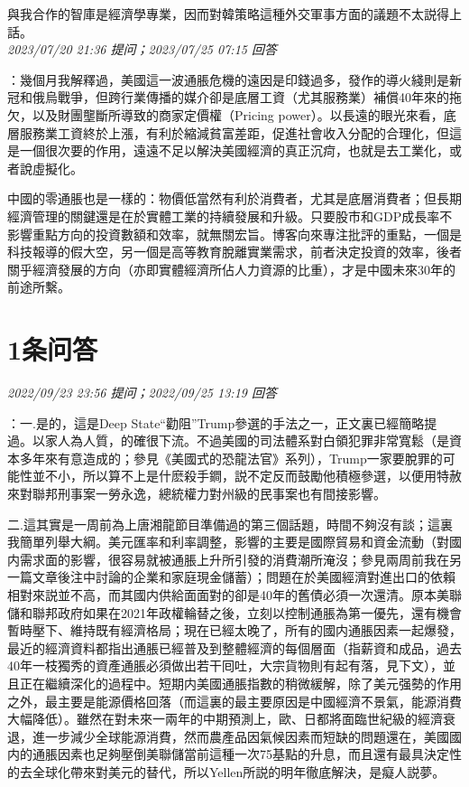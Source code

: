 \documentclass[twocolumn]{ctexart}
\begin{document}
與我合作的智庫是經濟學專業，因而對韓策略這種外交軍事方面的議題不太説得上話。
\\

\textit{\hfill\noindent\small 2023/07/20 21:36 提问；2023/07/25 07:15 回答}

：幾個月我解釋過，美國這一波通脹危機的遠因是印錢過多，發作的導火綫則是新冠和俄烏戰爭，但跨行業傳播的媒介卻是底層工資（尤其服務業）補償40年來的拖欠，以及財團壟斷所導致的商家定價權（Pricing power）。以長遠的眼光來看，底層服務業工資終於上漲，有利於縮減貧富差距，促進社會收入分配的合理化，但這是一個很次要的作用，遠遠不足以解決美國經濟的真正沉疴，也就是去工業化，或者說虛擬化。

中國的零通脹也是一樣的：物價低當然有利於消費者，尤其是底層消費者；但長期經濟管理的關鍵還是在於實體工業的持續發展和升級。只要股市和GDP成長率不影響重點方向的投資數額和效率，就無關宏旨。博客向來專注批評的重點，一個是科技報導的假大空，另一個是高等教育脫離實業需求，前者決定投資的效率，後者關乎經濟發展的方向（亦即實體經濟所佔人力資源的比重），才是中國未來30年的前途所繫。
\\

\section{1条问答}

\textit{\hfill\noindent\small 2022/09/23 23:56 提问；2022/09/25 13:19 回答}

：一.是的，這是Deep State“勸阻”Trump參選的手法之一，正文裏已經簡略提過。以家人為人質，的確很下流。不過美國的司法體系對白領犯罪非常寬鬆（是資本多年來有意造成的；參見《美國式的恐龍法官》系列），Trump一家要脫罪的可能性並不小，所以算不上是什麽殺手鐧，説不定反而鼓勵他積極參選，以便用特赦來對聯邦刑事案一勞永逸，總統權力對州級的民事案也有間接影響。

二.這其實是一周前為上唐湘龍節目準備過的第三個話題，時間不夠沒有談；這裏我簡單列舉大綱。美元匯率和利率調整，影響的主要是國際貿易和資金流動（對國内需求面的影響，很容易就被通脹上升所引發的消費潮所淹沒；參見兩周前我在另一篇文章後注中討論的企業和家庭現金儲蓄）；問題在於美國經濟對進出口的依賴相對來説並不高，而其國内供給面面對的卻是40年的舊債必須一次還清。原本美聯儲和聯邦政府如果在2021年政權輪替之後，立刻以控制通脹為第一優先，還有機會暫時壓下、維持既有經濟格局；現在已經太晚了，所有的國内通脹因素一起爆發，最近的經濟資料都指出通脹已經普及到整體經濟的每個層面（指薪資和成品，過去40年一枝獨秀的資產通脹必須做出若干囘吐，大宗貨物則有起有落，見下文），並且正在繼續深化的過程中。短期内美國通脹指數的稍微緩解，除了美元强勢的作用之外，最主要是能源價格回落（而這裏的最主要原因是中國經濟不景氣，能源消費大幅降低）。雖然在對未來一兩年的中期預測上，歐、日都將面臨世紀級的經濟衰退，進一步減少全球能源消費，然而農產品因氣候因素而短缺的問題還在，美國國内的通脹因素也足夠壓倒美聯儲當前這種一次75基點的升息，而且還有最具決定性的去全球化帶來對美元的替代，所以Yellen所説的明年徹底解決，是癡人説夢。
\end{document}

